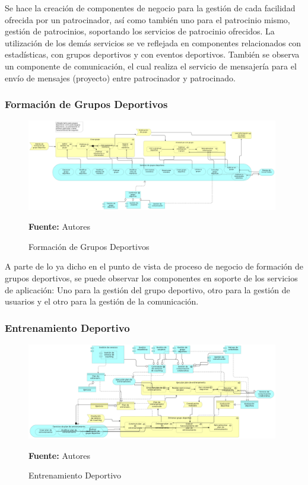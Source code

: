 Se hace la creación de componentes de negocio para la gestión de cada facilidad ofrecida por un patrocinador, así como también uno para el patrocinio mismo, gestión de patrocinios, soportando los servicios de patrocinio ofrecidos. La utilización de los demás servicios se ve reflejada en componentes relacionados con estadísticas, con grupos deportivos y con eventos deportivos. También se observa un componente de comunicación, el cual realiza el servicio de mensajería para el envío de mensajes (proyecto) entre patrocinador y patrocinado.


\subsubsection{Formación de Grupos Deportivos}

\begin{figure}[!htb]
  \begin{center}
    \includegraphics[width=11cm]{./imagenes/application_usage/formaciongruposdeportivos.png}
    \caption{Formación de Grupos Deportivos}
    \label{fig:au_formacion_grupos_deportivos}
    \textbf{Fuente:}  Autores
  \end{center}
\end{figure}

A parte de lo ya dicho en el punto de vista de proceso de negocio de formación de grupos deportivos, se puede observar los componentes en soporte de los servicios de aplicación: Uno para la gestión del grupo deportivo, otro para la gestión de usuarios y el otro para la gestión de la comunicación.

\subsubsection{Entrenamiento Deportivo}

\begin{figure}[!htb]
  \begin{center}
    \includegraphics[width=11cm]{./imagenes/application_usage/entrenamientodeportivo.png}
    \caption{Entrenamiento Deportivo}
    \label{fig:au_entrenamiento_deportivo}
    \textbf{Fuente:}  Autores
  \end{center}
\end{figure}

